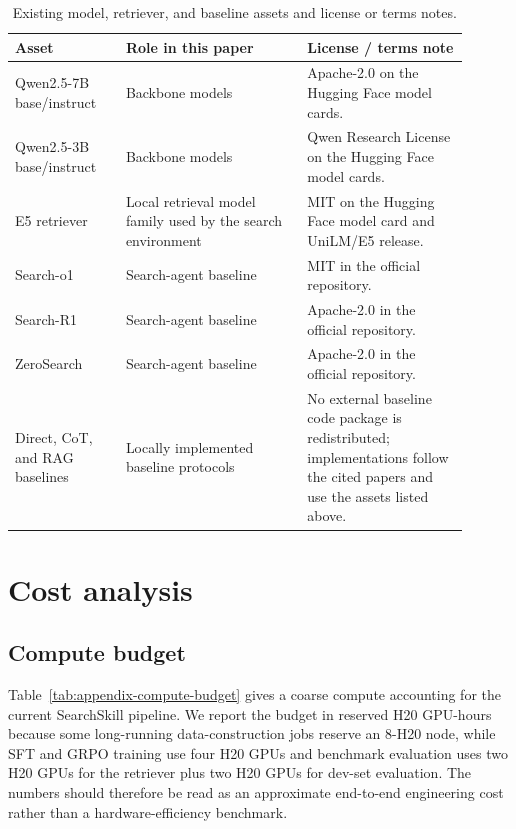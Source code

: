 \documentclass{article}
\begin{document}
\begin{table}[H]
  \centering
  \caption{Existing model, retriever, and baseline assets and license or terms notes.}
  \label{tab:appendix-model-baseline-licenses}
  \setlength{\tabcolsep}{6pt}
  \renewcommand{\arraystretch}{1.12}
  \scriptsize
  \begin{tabular}{p{0.22\linewidth}p{0.36\linewidth}p{0.32\linewidth}}
    \toprule
    \textbf{Asset} & \textbf{Role in this paper} & \textbf{License / terms note} \\
    \midrule
    Qwen2.5-7B base/instruct & Backbone models & Apache-2.0 on the Hugging Face model cards. \\
    Qwen2.5-3B base/instruct & Backbone models & Qwen Research License on the Hugging Face model cards. \\
    E5 retriever & Local retrieval model family used by the search environment & MIT on the Hugging Face model card and UniLM/E5 release. \\
    Search-o1 & Search-agent baseline & MIT in the official repository. \\
    Search-R1 & Search-agent baseline & Apache-2.0 in the official repository. \\
    ZeroSearch & Search-agent baseline & Apache-2.0 in the official repository. \\
    Direct, CoT, and RAG baselines & Locally implemented baseline protocols & No external baseline code package is redistributed; implementations follow the cited papers and use the assets listed above. \\
    \bottomrule
  \end{tabular}
\end{table}

\section{Cost analysis}
\label{app:cost-analysis}

\subsection{Compute budget}
\label{app:compute-budget}

Table~\ref{tab:appendix-compute-budget} gives a coarse compute accounting for the current SearchSkill pipeline. We report the budget in reserved H20 GPU-hours because some long-running data-construction jobs reserve an 8-H20 node, while SFT and GRPO training use four H20 GPUs and benchmark evaluation uses two H20 GPUs for the retriever plus two H20 GPUs for dev-set evaluation. The numbers should therefore be read as an approximate end-to-end engineering cost rather than a hardware-efficiency benchmark.
\end{document}
